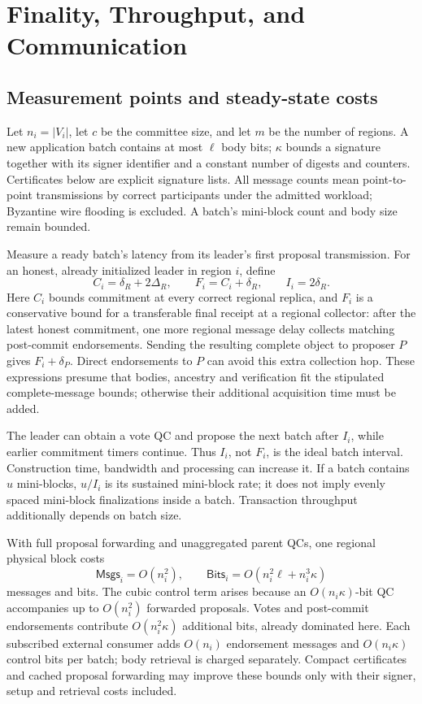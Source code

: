 \section{Finality, Throughput, and Communication}\label{sec:complexity}
\subsection{Measurement points and steady-state costs}
Let $n_i=|V_i|$, let $c$ be the committee size, and let $m$ be the number
of regions. A new application batch contains at most $\ell$ body bits;
$\kappa$ bounds a signature together with its signer identifier and a
constant number of digests and counters. Certificates below are explicit
signature lists. All message counts mean point-to-point transmissions by
correct participants under the admitted workload; Byzantine wire flooding
is excluded. A batch's mini-block count and body size remain bounded.

Measure a ready batch's latency from its leader's first proposal transmission.
For an honest, already initialized leader in region $i$, define
\[
 C_i=\delta_R+2\Delta_R,
 \qquad F_i=C_i+\delta_R,
 \qquad I_i=2\delta_R.
\]
Here $C_i$ bounds commitment at every correct regional replica, and $F_i$
is a conservative bound for a transferable final receipt at a regional
collector: after the latest honest commitment, one more regional message
delay collects matching post-commit endorsements. Sending the resulting
complete object to proposer $P$ gives $F_i+\delta_P$. Direct endorsements
to $P$ can avoid this extra collection hop. These expressions presume
that bodies, ancestry and verification fit the stipulated complete-message
bounds; otherwise their additional acquisition time must be added.

The leader can obtain a vote QC and propose the next batch after $I_i$,
while earlier commitment timers continue. Thus $I_i$, not $F_i$, is the
ideal batch interval. Construction time, bandwidth and processing can
increase it. If a batch contains $u$ mini-blocks, $u/I_i$ is its sustained
mini-block rate; it does not imply evenly spaced mini-block finalizations
inside a batch. Transaction throughput additionally depends on batch size.

With full proposal forwarding and unaggregated parent QCs, one regional
physical block costs
\[
 \mathsf{Msgs}_i=O(n_i^2),\qquad
 \mathsf{Bits}_i=O(n_i^2\ell+n_i^3\kappa)
\]
messages and bits. The cubic control term arises because an
$O(n_i\kappa)$-bit QC accompanies up to $O(n_i^2)$ forwarded proposals.
Votes and post-commit endorsements contribute $O(n_i^2\kappa)$ additional
bits, already dominated here. Each subscribed external consumer adds
$O(n_i)$ endorsement messages and $O(n_i\kappa)$ control bits per batch;
body retrieval is charged separately. Compact certificates and cached
proposal forwarding may improve these bounds only with their signer,
setup and retrieval costs included.


